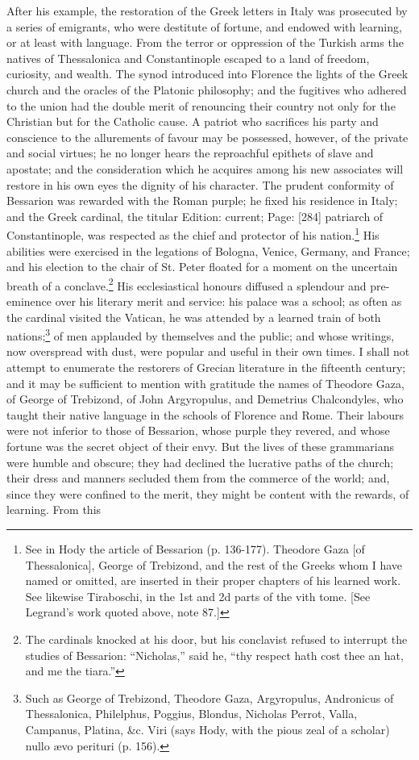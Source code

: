 After his example, the restoration of the Greek letters in Italy was prosecuted by a series of emigrants, who were destitute of fortune, and endowed with learning, or at least with language. From the terror or oppression of the Turkish arms the natives of Thessalonica and Constantinople escaped to a land of freedom, curiosity, and wealth. The synod introduced into Florence the lights of the Greek church and the oracles of the Platonic philosophy; and the fugitives who adhered to the union had the double merit of renouncing their country not only for the Christian but for the Catholic cause. A patriot who sacrifices his party and conscience to the allurements of favour may be possessed, however, of the private and social virtues; he no longer hears the reproachful epithets of slave and apostate; and the consideration which he acquires among his new associates will restore in his own eyes the dignity of his character. The prudent conformity of Bessarion was rewarded with the Roman purple; he fixed his residence in Italy; and the Greek cardinal, the titular Edition: current; Page: [284] patriarch of Constantinople, was respected as the chief and protector of his nation.\footnote{See in Hody the article of Bessarion (p. 136-177). Theodore Gaza [of Thessalonica], George of Trebizond, and the rest of the Greeks whom I have named or omitted, are inserted in their proper chapters of his learned work. See likewise Tiraboschi, in the 1st and 2d parts of the vith tome. [See Legrand\texthebrew{}’s work quoted above, note 87.]} His abilities were exercised in the legations of Bologna, Venice, Germany, and France; and his election to the chair of St. Peter floated for a moment on the uncertain breath of a conclave.\footnote{The cardinals knocked at his door, but his conclavist refused to interrupt the studies of Bessarion: \texthebrew{“}Nicholas,\texthebrew{}” said he, \texthebrew{“}thy respect hath cost thee an hat, and me the tiara.\texthebrew{}”} His ecclesiastical honours diffused a splendour and pre-eminence over his literary merit and service: his palace was a school; as often as the cardinal visited the Vatican, he was attended by a learned train of both nations;\footnote{Such as George of Trebizond, Theodore Gaza, Argyropulus, Andronicus of Thessalonica, Philelphus, Poggius, Blondus, Nicholas Perrot, Valla, Campanus, Platina, \&c. Viri (says Hody, with the pious zeal of a scholar) nullo ævo perituri (p. 156).} of men applauded by themselves and the public; and whose writings, now overspread with dust, were popular and useful in their own times. I shall not attempt to enumerate the restorers of Grecian literature in the fifteenth century; and it may be sufficient to mention with gratitude the names of Theodore Gaza, of George of Trebizond, of John Argyropulus, and Demetrius Chalcondyles, who taught their native language in the schools of Florence and Rome. Their labours were not inferior to those of Bessarion, whose purple they revered, and whose fortune was the secret object of their envy. But the lives of these grammarians were humble and obscure; they had declined the lucrative paths of the church; their dress and manners secluded them from the commerce of the world; and, since they were confined to the merit, they might be content with the rewards, of learning. From this 